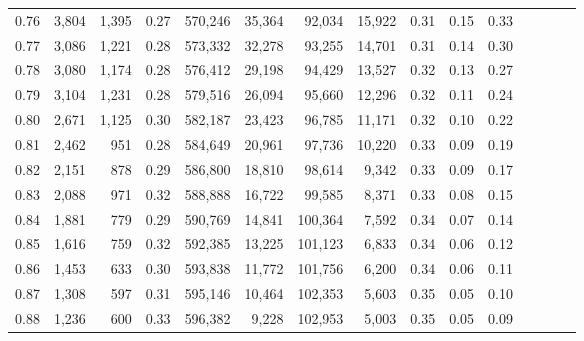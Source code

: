 \begin{tabular}{rrrcrrrrrrrrrrr}
0.76 &   3,804 &  1,395 &                                       0.27 &  570,246 &   35,364 &   92,034 &   15,922 &  0.31 &  0.15 &                         0.33 \\
0.77 &   3,086 &  1,221 &                                       0.28 &  573,332 &   32,278 &   93,255 &   14,701 &  0.31 &  0.14 &                         0.30 \\
0.78 &   3,080 &  1,174 &                                       0.28 &  576,412 &   29,198 &   94,429 &   13,527 &  0.32 &  0.13 &                         0.27 \\
0.79 &   3,104 &  1,231 &                                       0.28 &  579,516 &   26,094 &   95,660 &   12,296 &  0.32 &  0.11 &                         0.24 \\
0.80 &   2,671 &  1,125 &                                       0.30 &  582,187 &   23,423 &   96,785 &   11,171 &  0.32 &  0.10 &                         0.22 \\
0.81 &   2,462 &    951 &                                       0.28 &  584,649 &   20,961 &   97,736 &   10,220 &  0.33 &  0.09 &                         0.19 \\
0.82 &   2,151 &    878 &                                       0.29 &  586,800 &   18,810 &   98,614 &    9,342 &  0.33 &  0.09 &                         0.17 \\
0.83 &   2,088 &    971 &                                       0.32 &  588,888 &   16,722 &   99,585 &    8,371 &  0.33 &  0.08 &                         0.15 \\
0.84 &   1,881 &    779 &                                       0.29 &  590,769 &   14,841 &  100,364 &    7,592 &  0.34 &  0.07 &                         0.14 \\
0.85 &   1,616 &    759 &                                       0.32 &  592,385 &   13,225 &  101,123 &    6,833 &  0.34 &  0.06 &                         0.12 \\
0.86 &   1,453 &    633 &                                       0.30 &  593,838 &   11,772 &  101,756 &    6,200 &  0.34 &  0.06 &                         0.11 \\
0.87 &   1,308 &    597 &                                       0.31 &  595,146 &   10,464 &  102,353 &    5,603 &  0.35 &  0.05 &                         0.10 \\
0.88 &   1,236 &    600 &                                       0.33 &  596,382 &    9,228 &  102,953 &    5,003 &  0.35 &  0.05 &                         0.09 \\

\end{tabular}
